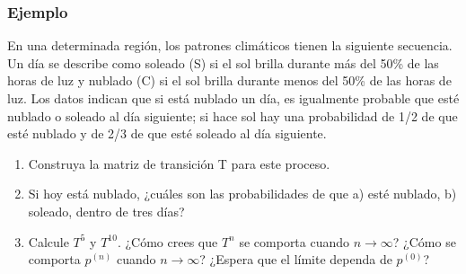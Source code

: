\documentclass[spanish]{beamer}
\begin{document}

\begin{frame}
\frametitle{Ejemplo}
En una determinada región, los patrones climáticos tienen la siguiente secuencia. Un día se describe como soleado (S) si el sol brilla durante más del 50\% de las horas de luz y nublado (C) si el sol brilla durante menos del 50\% de las horas de luz. Los datos indican que si está nublado un día, es igualmente probable que esté nublado o soleado al día siguiente; si hace sol hay una probabilidad de 1/2 de que esté nublado y de 2/3 de que esté soleado al día siguiente.

\begin{enumerate}
\item Construya la matriz de transición T para este proceso.
\item Si hoy está nublado, ¿cuáles son las probabilidades de que a) esté nublado, b) soleado, dentro de tres días?
\item Calcule $T^5$ y $T^{10}$. ¿Cómo crees que $T^n$ se comporta cuando $n \rightarrow  \infty$? ¿Cómo se comporta $p^{(n)}$ cuando $n \rightarrow  \infty$? ¿Espera que el límite dependa de $p^{(0)}$?
\end{enumerate}
\end{frame}



\end{document}
